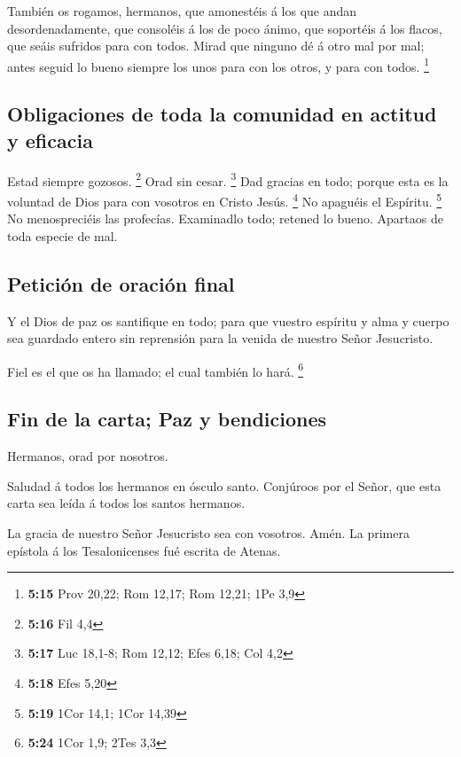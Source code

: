  También os rogamos, hermanos, que amonestéis á los que
andan desordenadamente, que consoléis á los de poco ánimo, que soportéis
á los flacos, que seáis sufridos para con todos.  Mirad que
ninguno dé á otro mal por mal; antes seguid lo bueno siempre los unos
para con los otros, y para con todos. \footnote{\textbf{5:15} Prov
  20,22; Rom 12,17; Rom 12,21; 1Pe 3,9}

\hypertarget{obligaciones-de-toda-la-comunidad-en-actitud-y-eficacia}{%
\subsection{Obligaciones de toda la comunidad en actitud y
eficacia}\label{obligaciones-de-toda-la-comunidad-en-actitud-y-eficacia}}

 Estad siempre gozosos. \footnote{\textbf{5:16} Fil 4,4}
 Orad sin cesar. \footnote{\textbf{5:17} Luc 18,1-8; Rom
  12,12; Efes 6,18; Col 4,2}  Dad gracias en todo; porque
esta es la voluntad de Dios para con vosotros en Cristo Jesús.
\footnote{\textbf{5:18} Efes 5,20}  No apaguéis el
Espíritu. \footnote{\textbf{5:19} 1Cor 14,1; 1Cor 14,39} 
No menospreciéis las profecías.  Examinadlo todo; retened
lo bueno.  Apartaos de toda especie de mal.

\hypertarget{peticiuxf3n-de-oraciuxf3n-final}{%
\subsection{Petición de oración
final}\label{peticiuxf3n-de-oraciuxf3n-final}}

 Y el Dios de paz os santifique en todo; para que vuestro
espíritu y alma y cuerpo sea guardado entero sin reprensión para la
venida de nuestro Señor Jesucristo.

 Fiel es el que os ha llamado; el cual también lo hará.
\footnote{\textbf{5:24} 1Cor 1,9; 2Tes 3,3}

\hypertarget{fin-de-la-carta-paz-y-bendiciones}{%
\subsection{Fin de la carta; Paz y
bendiciones}\label{fin-de-la-carta-paz-y-bendiciones}}

 Hermanos, orad por nosotros.

 Saludad á todos los hermanos en ósculo santo.
 Conjúroos por el Señor, que esta carta sea leída á todos
los santos hermanos.

 La gracia de nuestro Señor Jesucristo sea con vosotros.
Amén. La primera epístola á los Tesalonicenses fué escrita de Atenas.
